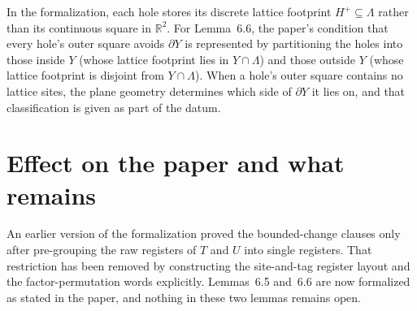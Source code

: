 \documentclass{article}
\begin{document}
In the formalization, each hole stores its discrete lattice footprint
$H^+\subseteq\Lambda$ rather than its continuous square in $\mathbb R^2$. For
Lemma~6.6, the paper's condition that every hole's outer square avoids
$\partial Y$ is represented by partitioning the holes into those inside $Y$
(whose lattice footprint lies in $Y\cap\Lambda$) and those outside $Y$ (whose
lattice footprint is disjoint from $Y\cap\Lambda$). When a hole's outer square
contains no lattice sites, the plane geometry determines which side of
$\partial Y$ it lies on, and that classification is given as part of the datum.

\section{Effect on the paper and what remains}

An earlier version of the formalization proved the bounded-change clauses only
after pre-grouping the raw registers of $T$ and $U$ into single registers. That
restriction has been removed by constructing the site-and-tag register layout
and the factor-permutation words explicitly. Lemmas~6.5 and~6.6 are now
formalized as stated in the paper, and nothing in these two lemmas remains
open.
\end{document}
